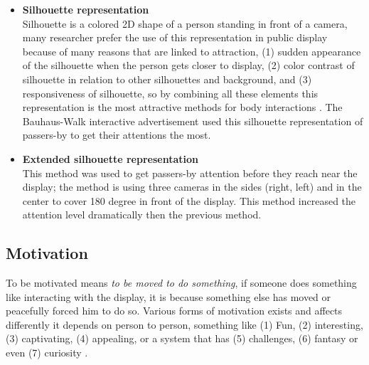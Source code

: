 \begin{itemize}

\item \textbf{Silhouette representation} \\
Silhouette is a colored 2D shape of a person standing in front of a camera, many researcher prefer the use of this representation in public display because of many reasons that are linked to attraction, (1) sudden appearance of the silhouette when the person gets closer to display, (2) color contrast of silhouette in relation to other silhouettes and background, and (3) responsiveness of silhouette, so by combining all these elements this representation is the most attractive methods for body interactions \cite{LookingGlass}. The Bauhaus-Walk interactive advertisement used this silhouette representation of passers-by to get their attentions the most.


\item \textbf{Extended silhouette representation} \\
This method was used to get passers-by attention before they reach near the display; the method is using three cameras in the sides (right, left) and in the center to cover 180 degree in front of the display. This method increased the attention level dramatically then the previous method.


\end{itemize}

\subsection{Motivation}
To be motivated means \emph{to be moved to do something}\cite{motiv}, if someone does something like interacting with the display, it is because something else has moved or peacefully forced him to do so. Various forms of motivation exists and affects differently it depends on person to person, something like (1) Fun, (2) interesting, (3) captivating, (4) appealing, or a system that has (5) challenges, (6) fantasy or even (7) curiosity \cite{ toward_motivation}. 

